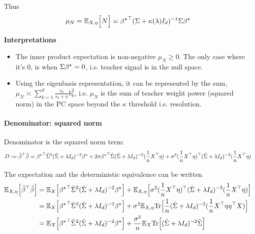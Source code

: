 Thus
\begin{equation}
\mu_{N}=\mathbb{E}_{X,\eta}\Big[N\Big]\asymp{{\beta^{\star}}}^{\top}(\Sigma+\kappa(\lambda)I_{d})^{-1}\Sigma{\beta^{\star}}\label{eq:mean_numerator_dotprod}
\end{equation}

\textbf{Interpretations}
\begin{itemize}
\item The inner product expectation is non-negative $\mu_{N}\geq0$. The
only case where it's 0, is when $\Sigma{\beta^{\star}}=0$, i.e. teacher
signal is in the null space.
\item Using the eigenbasis representation, it can be represented by the
sum, $\mu_{N}\asymp\sum_{k=1}^{d}\frac{s_{k}}{s_{k}+\kappa}b_{k}^{2}$,
i.e. $\mu_{N}$ is the sum of teacher weight power (squared norm)
in the PC space beyond the $\kappa$ threshold i.e. resolution.
\end{itemize}

\paragraph{Denominator: squared norm}

Denominator is the squared norm term:
\[
D:={\hat{\beta}}^{\top}\hat{\beta}={{\beta^{\star}}}^{\top}\hat{\Sigma}^{2}(\hat{\Sigma}+\lambda I_{d})^{-2}{\beta^{\star}}+2\sigma{{\beta^{\star}}}^{\top}\hat{\Sigma}(\hat{\Sigma}+\lambda I_{d})^{-2}(\frac{1}{n}X^{\top}\eta)+\sigma^{2}(\frac{1}{n}X^{\top}\eta)^{\top}(\hat{\Sigma}+\lambda I_{d})^{-2}(\frac{1}{n}X^{\top}\eta)
\]

The expectation and the deterministic equivalence can be written
\begin{align*}
\mathbb{E}_{X,\eta}\Big[{\hat{\beta}}^{\top}\hat{\beta}\Big] & =\mathbb{E}_{X}\Big[{{\beta^{\star}}}^{\top}\hat{\Sigma}^{2}(\hat{\Sigma}+\lambda I_{d})^{-2}{\beta^{\star}}\Big]+\mathbb{E}_{X,\eta}\Big[\sigma^{2}(\frac{1}{n}X^{\top}\eta)^{\top}(\hat{\Sigma}+\lambda I_{d})^{-2}(\frac{1}{n}X^{\top}\eta)\Big]\\
 & =\mathbb{E}_{X}\Big[{{\beta^{\star}}}^{\top}\hat{\Sigma}^{2}(\hat{\Sigma}+\lambda I_{d})^{-2}{\beta^{\star}}\Big]+\sigma^{2}\mathbb{E}_{X,\eta}\mathrm{Tr}\Big[\frac{1}{n}(\hat{\Sigma}+\lambda I_{d})^{-2}(\frac{1}{n}X^{\top}\eta\eta^{\top}X)\Big]\\
 & =\mathbb{E}_{X}\Big[{{\beta^{\star}}}^{\top}\hat{\Sigma}^{2}(\hat{\Sigma}+\lambda I_{d})^{-2}{\beta^{\star}}\Big]+\frac{\sigma^{2}}{n}\mathbb{E}_{X}\mathrm{Tr}\Big[(\hat{\Sigma}+\lambda I_{d})^{-2}\hat{\Sigma}\Big]
\end{align*}


